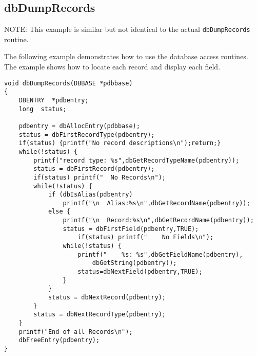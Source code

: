 \subsection{dbDumpRecords}

NOTE: This example is similar but not identical to the actual \verb|dbDumpRecords| routine.

The following example demonstrates how to use the database access routines.
The example shows how to locate each record and display each field.

\begin{verbatim}
void dbDumpRecords(DBBASE *pdbbase)
{
    DBENTRY  *pdbentry;
    long  status;

    pdbentry = dbAllocEntry(pdbbase);
    status = dbFirstRecordType(pdbentry);
    if(status) {printf("No record descriptions\n");return;}
    while(!status) {
        printf("record type: %s",dbGetRecordTypeName(pdbentry));
        status = dbFirstRecord(pdbentry);
        if(status) printf("  No Records\n"); 
        while(!status) {
            if (dbIsAlias(pdbentry)
                printf("\n  Alias:%s\n",dbGetRecordName(pdbentry));
            else {
                printf("\n  Record:%s\n",dbGetRecordName(pdbentry));
                status = dbFirstField(pdbentry,TRUE);
                    if(status) printf("    No Fields\n");
                while(!status) {
                    printf("    %s: %s",dbGetFieldName(pdbentry),
                        dbGetString(pdbentry));
                    status=dbNextField(pdbentry,TRUE);
                }
            }
            status = dbNextRecord(pdbentry);
        }
        status = dbNextRecordType(pdbentry);
    }
    printf("End of all Records\n");
    dbFreeEntry(pdbentry);
}
\end{verbatim}
